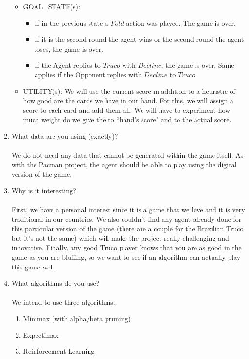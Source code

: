 \documentclass{article}
\begin{document}
\begin{enumerate}
\begin{itemize}
\begin{itemize}
	\end{itemize}
	\item GOAL\_STATE(s):
	\begin{itemize}
		\item If in the previous state a $Fold$ action was played. The game is over.
		\item If it is the second round the agent wins or the second round the agent loses, the game is over.
		\item If the Agent replies to $Truco$ with $Decline$, the game is over. Same applies if the Opponent replies with $Decline$ to $Truco$.
	\end{itemize}
	\item UTILITY(s): We will use the current score in addition to a heuristic of how good are the cards we have in our hand. For this, we will assign a score to each card and add them all. We will have to experiment how much weight do we give the to ``hand's score" and to the actual score.
\end{itemize}

\item What data are you using (exactly)?
\\\\
We do not need any data that cannot be generated within the game itself. As with the Pacman project, the agent should be able to play using the digital version of the game.
\\
\item Why is it interesting?
\\\\
First, we have a personal interest since it is a game that we love and it is very traditional in our countries. We also couldn’t find any agent already done for this particular version of the game (there are a couple for the Brazilian Truco but it’s not the same) which will make the project really challenging and innovative. Finally, any good Truco player knows that you are as good in the game as you are bluffing, so we want to see if an algorithm can actually play this game well.
\item What algorithms do you use? 
\\\\
We intend to use three algorithms:
\begin{enumerate}
	\item Minimax (with alpha/beta pruning)
	\item Expectimax
	\item Reinforcement Learning
\end{enumerate}



\end{enumerate}
\end{document}
